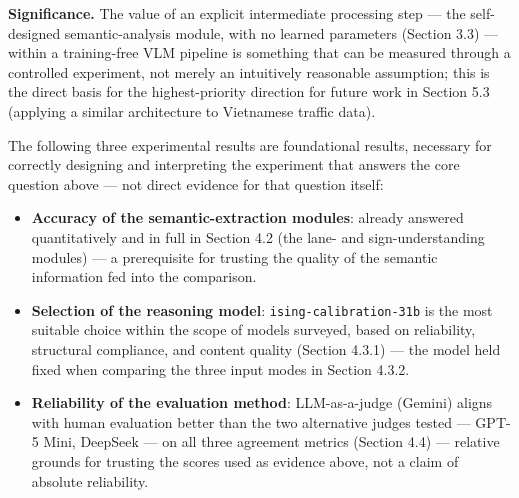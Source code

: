 \documentclass[12pt,a4paper]{report}
\begin{document}
\textbf{Significance.} The value of an explicit intermediate processing step --- the self-designed semantic-analysis module, with no learned parameters (Section 3.3) --- within a training-free VLM pipeline is something that can be measured through a controlled experiment, not merely an intuitively reasonable assumption; this is the direct basis for the highest-priority direction for future work in Section 5.3 (applying a similar architecture to Vietnamese traffic data).

The following three experimental results are foundational results, necessary for correctly designing and interpreting the experiment that answers the core question above --- not direct evidence for that question itself:

\begin{itemize}
    \item \textbf{Accuracy of the semantic-extraction modules}: already answered quantitatively and in full in Section 4.2 (the lane- and sign-understanding modules) --- a prerequisite for trusting the quality of the semantic information fed into the comparison.
    \item \textbf{Selection of the reasoning model}: \texttt{ising-calibration-31b} is the most suitable choice within the scope of models surveyed, based on reliability, structural compliance, and content quality (Section 4.3.1) --- the model held fixed when comparing the three input modes in Section 4.3.2.
    \item \textbf{Reliability of the evaluation method}: LLM-as-a-judge (Gemini) aligns with human evaluation better than the two alternative judges tested --- GPT-5 Mini, DeepSeek --- on all three agreement metrics (Section 4.4) --- relative grounds for trusting the scores used as evidence above, not a claim of absolute reliability.
\end{itemize}
\end{document}
